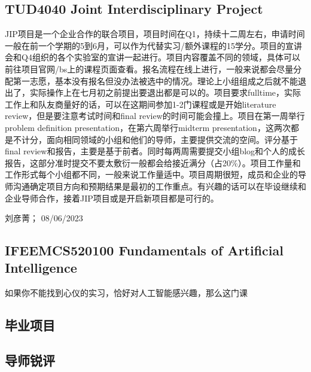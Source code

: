 \subsection{TUD4040 Joint Interdisciplinary Project}
JIP项目是一个企业合作的联合项目，项目时间在Q1，持续十二周左右，申请时间一般在前一个学期的5到6月，可以作为代替实习/额外课程的15学分。项目的宣讲会和Q4组织的各个实验室的宣讲一起进行。项目内容覆盖不同的领域，具体可以前往项目官网/bs上的课程页面查看。报名流程在线上进行，一般来说都会尽量分配第一志愿，基本没有报名但没办法被选中的情况。理论上小组组成之后就不能退出了，实际操作上在七月初之前提出要退出都是可以的。项目要求fulltime，实际工作上和队友商量好的话，可以在这期间参加1-2门课程或是开始literature review，但是要注意考试时间和final review的时间可能会撞上。项目在第一周举行problem definition presentation，在第六周举行midterm presentation，这两次都是不计分，面向相同领域的小组和他们的导师，主要提供交流的空间。评分基于final review和报告，主要是基于前者。同时每两周需要提交小组blog和个人的成长报告，这部分准时提交不要太敷衍一般都会给接近满分（占20\%）。项目工作量和工作形式每个小组都不同，一般来说工作量适中。项目周期很短，成员和企业的导师沟通确定项目方向和预期结果是最初的工作重点。有兴趣的话可以在毕设继续和企业导师合作，接着JIP项目或是开启新项目都是可行的。

\begin{flushright}
刘彦菁； 08/06/2023
\end{flushright}
\subsection{IFEEMCS520100 Fundamentals of Artificial Intelligence}
如果你不能找到心仪的实习，恰好对人工智能感兴趣，那么这门课

\subsection{毕业项目}

\subsection{导师锐评}
